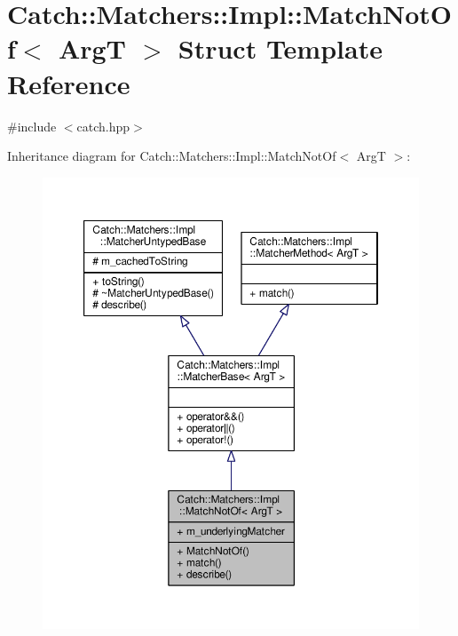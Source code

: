\hypertarget{struct_catch_1_1_matchers_1_1_impl_1_1_match_not_of}{\section{Catch\-:\-:Matchers\-:\-:Impl\-:\-:Match\-Not\-Of$<$ Arg\-T $>$ Struct Template Reference}
\label{struct_catch_1_1_matchers_1_1_impl_1_1_match_not_of}
}


{\ttfamily \#include $<$catch.\-hpp$>$}



Inheritance diagram for Catch\-:\-:Matchers\-:\-:Impl\-:\-:Match\-Not\-Of$<$ Arg\-T $>$\-:
\nopagebreak
\begin{figure}[H]
\begin{center}
\leavevmode
\includegraphics[width=350pt]{struct_catch_1_1_matchers_1_1_impl_1_1_match_not_of__inherit__graph}
\end{center}
\end{figure}


